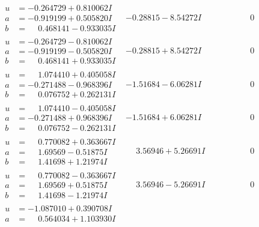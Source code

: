 \documentclass[1p]{elsarticle_modified}
\theoremstyle{definition}
\begin{document}
$$\begin{array}{c|c|c}
 \hline 
\begin{aligned}
u &= -0.264729 + 0.810062 I \\
a &= -0.919199 + 0.505820 I \\
b &= \phantom{-}0.468141 - 0.933035 I\end{aligned}
 & -0.28815 - 8.54272 I & \phantom{-0.000000 } 0 \\ \hline\begin{aligned}
u &= -0.264729 - 0.810062 I \\
a &= -0.919199 - 0.505820 I \\
b &= \phantom{-}0.468141 + 0.933035 I\end{aligned}
 & -0.28815 + 8.54272 I & \phantom{-0.000000 } 0 \\ \hline\begin{aligned}
u &= \phantom{-}1.074410 + 0.405058 I \\
a &= -0.271488 - 0.968396 I \\
b &= \phantom{-}0.076752 + 0.262131 I\end{aligned}
 & -1.51684 - 6.06281 I & \phantom{-0.000000 } 0 \\ \hline\begin{aligned}
u &= \phantom{-}1.074410 - 0.405058 I \\
a &= -0.271488 + 0.968396 I \\
b &= \phantom{-}0.076752 - 0.262131 I\end{aligned}
 & -1.51684 + 6.06281 I & \phantom{-0.000000 } 0 \\ \hline\begin{aligned}
u &= \phantom{-}0.770082 + 0.363667 I \\
a &= \phantom{-}1.69569 - 0.51875 I \\
b &= \phantom{-}1.41698 + 1.21974 I\end{aligned}
 & \phantom{-}3.56946 + 5.26691 I & \phantom{-0.000000 } 0 \\ \hline\begin{aligned}
u &= \phantom{-}0.770082 - 0.363667 I \\
a &= \phantom{-}1.69569 + 0.51875 I \\
b &= \phantom{-}1.41698 - 1.21974 I\end{aligned}
 & \phantom{-}3.56946 - 5.26691 I & \phantom{-0.000000 } 0 \\ \hline\begin{aligned}
u &= -1.087010 + 0.390708 I \\
a &= \phantom{-}0.564034 + 1.103930 I \\

\end{aligned}
\end{array}$$
\end{document}
